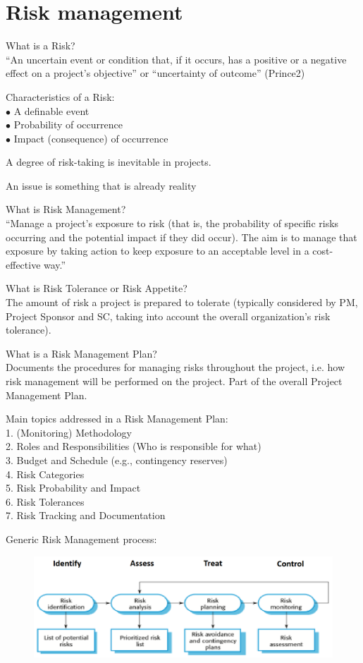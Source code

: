 \documentclass[]{project_plan}
\newcommand{\bulletPoint}{\hspace{-3.1pt}$\bullet$ \hspace{5pt}}
\begin{document}
\chapter{Risk management}

What is a Risk?\\“An uncertain event or condition that, if it occurs, has a positive or a
negative effect on a project’s objective” or “uncertainty of outcome” (Prince2)

Characteristics of a Risk:\\
\bulletPoint A definable event\\
\bulletPoint Probability of occurrence\\
\bulletPoint Impact (consequence) of occurrence

A degree of risk-taking is inevitable in projects.

An issue is something that is already reality

What is Risk Management?\\ “Manage a project’s exposure to risk (that is, the probability of
specific risks occurring and the potential impact if they did occur). The aim is to manage that
exposure by taking action to keep exposure to an acceptable level in a cost-effective way.”

What is Risk Tolerance or Risk Appetite?\\ The amount of risk a project is prepared to
tolerate (typically considered by PM, Project Sponsor and SC, taking into account the
overall organization’s risk tolerance).

What is a Risk Management Plan?\\ Documents the procedures for managing risks
throughout the project, i.e. how risk management will be performed on the project. Part
of the overall Project Management Plan.

Main topics addressed in a Risk Management Plan:\\
1. (Monitoring) Methodology\\
2. Roles and Responsibilities (Who is responsible for what)\\
3. Budget and Schedule (e.g., contingency reserves)\\
4. Risk Categories\\
5. Risk Probability and Impact\\
6. Risk Tolerances\\
7. Risk Tracking and Documentation

Generic Risk Management process:
\begin{figure}[h!]
  \centering
  \includegraphics[width=\linewidth]{generic_risk_management_process.png}
\end{figure}
\end{document}
